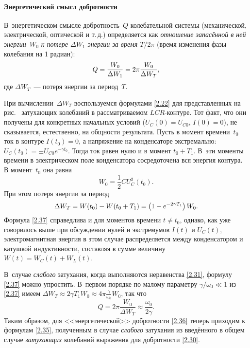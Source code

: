 \paragraph{Энергетический смысл добротности}
В~энергетическом смысле добротность~$Q$ колебательной системы
(механической, электрической, оптической и т.\,д.) определяется как 
\emph{отношение
запасённой в ней энергии~$W_0$ к потере $\Delta W_1$ энергии за время $T/2\pi$}
(время изменения фазы колебания на 1 радиан):
\begin{equation}\eqmark{2.36}
Q=\dfrac{W_0}{\Delta W_1}=2\pi\dfrac{W_0}{\Delta W_T},
\end{equation}
где  $\Delta W_T$~--- потеря энергии за период~$T$.

При вычислении~$\Delta W_T$
воспользуемся формулами \eqref{2.22} для представленных на рис.~
затухающих колебаний в рассматриваемом $LCR$-контуре. Тот факт, что
они получены для конкретных начальных условий ($U_C(0)=U_{C0}$, $I(0)=0$),
не сказывается, естественно, на общности результата. Пусть в момент времени~$t_0$ ток
в контуре $I(t_0)=0$, а напряжение на конденсаторе экстремально: $U_C(t_0)=\pm
U_{C0}e^{-\gamma t_0}$. Тогда ток равен нулю и в момент $t_0+T_1$. В~эти моменты
времени в электрическом поле конденсатора сосредоточена вся энергия контура. 
В момент~$t_0$ она равна
\begin{equation*}
W_0 = \frac12 CU_C^2(t_0).
\end{equation*}
При этом потеря энергии за период
\begin{equation}
	\eqmark{2.37}
			 \Delta W_T = W(t_0)-W(t_0+T_1)=\left(1-e^{-2\gamma T_1} \right)W_0.
\end{equation}
Формула \eqref{2.37} справедлива и для моментов времени $t\ne t_0$, однако, 
как уже говорилось выше при обсуждении нулей и экстремумов $I(t)$ и $U_C(t)$,
электромагнитная энергия в этом случае распределяется между конденсатором и
катушкой индуктивности, составляя в сумме величину~$W(t)=W_C(t)+W_L(t)$.

В~случае \emph{слабого} затухания, когда выполняются неравенства
\eqref{2.31}, формулу \eqref{2.37} можно упростить. В~первом порядке по малому
параметру $\gamma/\omega_0 \ll 1$
из \eqref{2.37} имеем 
$\Delta W_T \approx 2\gamma T_1 W_0 \approx 4\pi \frac{\gamma}{\omega_0} W_0$, так что
\begin{equation*}
Q = 2\pi \frac{W_0}{\Delta W_T} \approx \frac{\omega_0}{2\gamma}.
\end{equation*}
Таким образом, для <<энергетической>> добротности \eqref{2.36} теперь 
приходим к формулам \eqref{2.35}, полученным в случае \emph{слабого} 
затухания из введённого в общем случае \emph{затухающих} колебаний 
выражения для добротности \eqref{2.30}.

